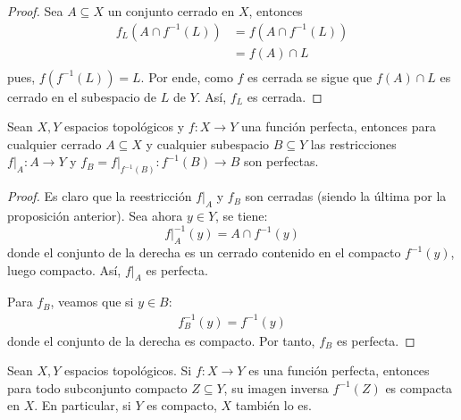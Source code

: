 \documentclass[12pt]{report}
\theoremstyle{largebreak}
\newcommand\cf[3]{\ensuremath{#1:#2\rightarrow#3}}
\begin{document}
    \begin{proof}
        Sea $A\subseteq X$ un conjunto cerrado en $X$, entonces
        \begin{equation*}
            \begin{split}
                f_L(A\cap f^{-1}(L))&=f(A\cap f^{-1}(L))\\
                &=f(A)\cap L\\
            \end{split}
        \end{equation*}
        pues, $f(f^{-1}(L))=L$. Por ende, como $f$ es cerrada se sigue que $f(A)\cap L$ es cerrado en el subespacio de $L$ de $Y$. Así, $f_L$ es cerrada.
    \end{proof}

    \begin{propo}
        Sean $X,Y$ espacios topológicos y $\cf{f}{X}{Y}$ una función perfecta, entonces para cualquier cerrado $A\subseteq X$ y cualquier subespacio $B\subseteq Y$ las restricciones $\cf{f\big|_A}{A}{Y}$ y $\cf{f_B=f\big|_{ f^{-1}(B)}}{f^{-1}(B)}{B}$ son perfectas.
    \end{propo}

    \begin{proof}
        Es claro que la reestricción $f\big|_A$ y $f_B$ son cerradas (siendo la última por la proposición anterior). Sea ahora $y\in Y$, se tiene:
        \begin{equation*}
            f\big|_{A}^{-1}(y)=A\cap f^{-1}(y)
        \end{equation*}
        donde el conjunto de la derecha es un cerrado contenido en el compacto $f^{-1}(y)$, luego compacto. Así, $f\big|_A$ es perfecta.

        Para $f_B$, veamos que si $y\in B$:
        \begin{equation*}
            \begin{split}
                f_B^{-1}(y)=f^{-1}(y)
            \end{split}
        \end{equation*}
        donde el conjunto de la derecha es compacto. Por tanto, $f_B$ es perfecta.
    \end{proof}

    \begin{theor}
        Sean $X,Y$ espacios topológicos. Si $\cf{f}{X}{Y}$ es una función perfecta, entonces para todo subconjunto compacto $Z\subseteq Y$, su imagen inversa $f^{-1}(Z)$ es compacta en $X$. En particular, si $Y$ es compacto, $X$ también lo es.
    \end{theor}
\end{document}
